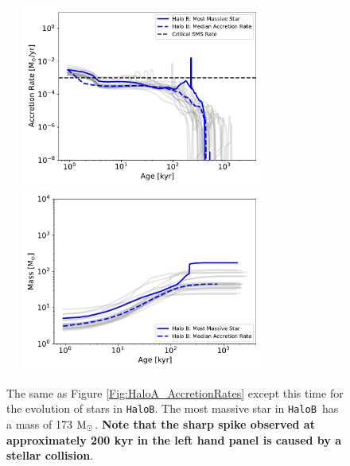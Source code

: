 \documentclass[twocolumn,iop,revtex4]{openjournal}
\newcommand{\msolarc} {$\rm{M_{\odot}}$}
\newcommand{\hb} {\texttt{HaloB~}}
\newcommand{\hbc} {\texttt{HaloB}}
\begin{document}


\begin{figure}
\centering
\begin{minipage}{175mm}      \begin{center}
    \centerline{
      \includegraphics[width=9.0cm, height=6cm]{FIGURES/AccretionRate_HaloB.pdf}
      \includegraphics[width=9.0cm, height=6cm]{FIGURES/Mass_HaloB.pdf}}
    \caption{
      The same as Figure \ref{Fig:HaloA_AccretionRates} except this time for the
      evolution of stars in \hbc. The most massive star in \hb has a mass of 173 \msolarc.
      \textbf{Note that the sharp spike observed at approximately 200 kyr in the left hand panel
      is caused by a stellar collision}.
    }
\label{Fig:HaloB_AccretionRates}
\end{center} \end{minipage}
\end{figure}

\end{document}
